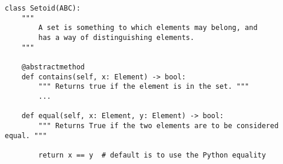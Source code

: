 \par\begin{minipage}{76ex}
\begin{verbatim}
class Setoid(ABC):
    """
        A set is something to which elements may belong, and
        has a way of distinguishing elements.
    """

    @abstractmethod
    def contains(self, x: Element) -> bool:
        """ Returns true if the element is in the set. """
        ...

    def equal(self, x: Element, y: Element) -> bool:
        """ Returns True if the two elements are to be considered equal. """

        return x == y  # default is to use the Python equality
\end{verbatim}
\end{minipage}\par